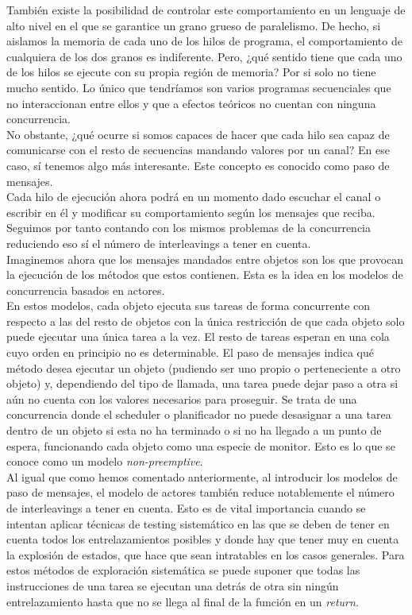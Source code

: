 También existe la posibilidad de controlar este comportamiento en un lenguaje de alto nivel en el que se garantice un grano grueso de paralelismo. De hecho, si aislamos la memoria de cada uno de los hilos de programa, el comportamiento de cualquiera de los dos granos es indiferente. Pero, ¿qué sentido tiene que cada uno de los hilos se ejecute con su propia región de memoria? Por si solo no tiene mucho sentido. Lo único que tendríamos son varios programas secuenciales que no interaccionan entre ellos y que a efectos teóricos no cuentan con ninguna concurrencia.\\

No obstante, ¿qué ocurre si somos capaces de hacer que cada hilo sea capaz de comunicarse con el resto de secuencias mandando valores por un canal? En ese caso, sí tenemos algo más interesante. Este concepto es conocido como paso de mensajes.\\

Cada hilo de ejecución ahora podrá en un momento dado escuchar el canal o escribir en él y modificar su comportamiento según los mensajes que reciba. Seguimos por tanto contando con los mismos problemas de la concurrencia reduciendo eso sí el número de interleavings a tener en cuenta.\\

Imaginemos ahora que los mensajes mandados entre objetos son los que provocan la ejecución de los métodos que estos contienen. Esta es la idea en los modelos de concurrencia basados en actores.\\

En estos modelos, cada objeto ejecuta sus tareas de forma concurrente con respecto a las del resto de objetos con la única restricción de que cada objeto solo puede ejecutar una única tarea a la vez. El resto de tareas esperan en una cola cuyo orden en principio no es determinable. El paso de mensajes indica qué método desea ejecutar un objeto (pudiendo ser uno propio o perteneciente a otro objeto) y, dependiendo del tipo de llamada, una tarea puede dejar paso a otra si aún no cuenta con los valores necesarios para proseguir. Se trata de una concurrencia donde el scheduler o planificador no puede desasignar a una tarea dentro de un objeto si esta no ha terminado o si no ha llegado a un punto de espera, funcionando cada objeto como una especie de monitor. Esto es lo que se conoce como un modelo \emph{non-preemptive}.\\

Al igual que como hemos comentado anteriormente, al introducir los modelos de paso de mensajes, el modelo de actores también reduce notablemente el número de interleavings a tener en cuenta. Esto es de vital importancia cuando se intentan aplicar técnicas de testing sistemático en las que se deben de tener en cuenta todos los entrelazamientos posibles y donde hay que tener muy en cuenta la explosión de estados, que hace que sean intratables en los casos generales. Para estos métodos de exploración sistemática se puede suponer que todas las instrucciones de una tarea se ejecutan una detrás de otra sin ningún entrelazamiento hasta que no se llega al final de la función en un \emph{return}.\\

